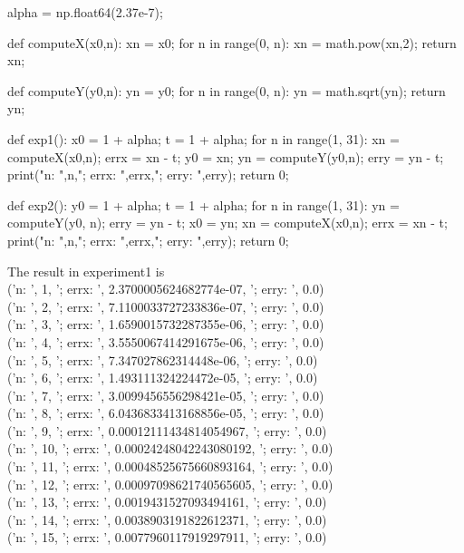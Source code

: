 \documentclass[12pt]{article}
\begin{document}
\begin{enumerate}
\begin{enumerate}
\begin{python}
alpha = np.float64(2.37e-7);

def computeX(x0,n):
    xn = x0;
    for n in range(0, n):
        xn = math.pow(xn,2);
    return xn;

def computeY(y0,n):
    yn = y0;
    for n in range(0, n):
        yn = math.sqrt(yn);
    return yn;

def exp1():
    x0 = 1 + alpha;
    t = 1 + alpha;
    for n in range(1, 31):
        xn = computeX(x0,n);
        errx = xn - t;
        y0 = xn;
        yn = computeY(y0,n);
        erry = yn - t;
        print("n: ",n,"; errx: ",errx,"; erry: ",erry);
    return 0;

def exp2():
    y0 = 1 + alpha;
    t = 1 + alpha;
    for n in range(1, 31):
        yn = computeY(y0, n);
        erry = yn - t;
        x0 = yn;
        xn = computeX(x0,n);
        errx = xn - t;
        print("n: ",n,"; errx: ",errx,"; erry: ",erry);
    return 0;
  \end{python}
The result in experiment1 is\\
('n: ', 1, '; errx: ', 2.3700005624682774e-07, '; erry: ', 0.0)\\
('n: ', 2, '; errx: ', 7.1100033727233836e-07, '; erry: ', 0.0)\\
('n: ', 3, '; errx: ', 1.6590015732287355e-06, '; erry: ', 0.0)\\
('n: ', 4, '; errx: ', 3.5550067414291675e-06, '; erry: ', 0.0)\\
('n: ', 5, '; errx: ', 7.347027862314448e-06, '; erry: ', 0.0)\\
('n: ', 6, '; errx: ', 1.493111324224472e-05, '; erry: ', 0.0)\\
('n: ', 7, '; errx: ', 3.0099456556298421e-05, '; erry: ', 0.0)\\
('n: ', 8, '; errx: ', 6.0436833413168856e-05, '; erry: ', 0.0)\\
('n: ', 9, '; errx: ', 0.00012111434814054967, '; erry: ', 0.0)\\
('n: ', 10, '; errx: ', 0.00024248042243080192, '; erry: ', 0.0)\\
('n: ', 11, '; errx: ', 0.00048525675660893164, '; erry: ', 0.0)\\
('n: ', 12, '; errx: ', 0.00097098621740565605, '; erry: ', 0.0)\\
('n: ', 13, '; errx: ', 0.0019431527093494161, '; erry: ', 0.0)\\
('n: ', 14, '; errx: ', 0.0038903191822612371, '; erry: ', 0.0)\\
('n: ', 15, '; errx: ', 0.0077960117919297911, '; erry: ', 0.0)\\

\end{enumerate}
\end{enumerate}
\end{document}
